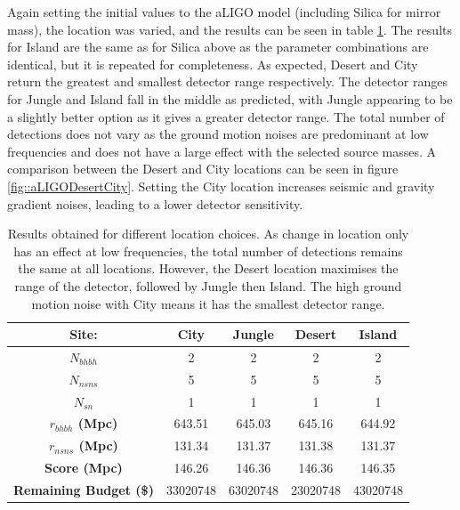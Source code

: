 \documentclass{article}
\begin{document}
Again setting the initial values to the aLIGO model (including Silica
for mirror mass), the location was varied, and the results can be seen
in table \ref{tab::locationtest}. The results for Island are the same
as for Silica above as the parameter combinations are identical, but
it is repeated for completeness. As expected, Desert and City return
the greatest and smallest detector range respectively. The detector
ranges for Jungle and Island fall in the middle as predicted, with
Jungle appearing to be a slightly better option as it gives a greater
detector range. The total number of detections does not vary as the
ground motion noises are predominant at low frequencies and does not
have a large effect with the selected source masses. A comparison
between the Desert and City locations can be seen in figure
\ref{fig::aLIGODesertCity}. Setting the City location increases
seismic and gravity gradient noises, leading to a lower detector
sensitivity. 
    
    \begin{table}[h!]
    \centering
    \captionsetup{width=0.9\textwidth}
    \caption{Results obtained for different location choices. As
      change in location only has an effect at low frequencies, the
      total number of detections remains the same at all
      locations. However, the Desert location maximises the range of
      the detector, followed by Jungle then Island. The high ground
      motion noise with City means it has the smallest detector
      range.}
    \begin{tabular}{ |c|c|c|c|c| } 
     \hline
     \textbf{Site:} & \textbf{City}  & \textbf{Jungle}  & \textbf{Desert}  & \textbf{Island} \\     \hline
     \textbf{$N_{bhbh}$}  & 2 & 2 & 2 & 2\\ 
     \hline
     \textbf{$N_{nsns}$}  & 5 & 5 & 5 & 5\\ 
     \hline
     \textbf{$N_{sn}$}  & 1 & 1  & 1 & 1 \\ 
     \hline
     \textbf{$r_{bhbh}$ (Mpc)}  & 643.51 & 645.03 & 645.16  & 644.92 \\ 
     \hline
     \textbf{$r_{nsns}$ (Mpc)}  & 131.34  & 131.37  & 131.38 & 131.37 \\ 
     \hline
    \textbf{Score (Mpc)}  & 146.26  & 146.36  & 146.36  & 146.35 \\ 
    \hline
    \textbf{Remaining Budget (\$)}  & 33020748  & 63020748  & 23020748 & 43020748 \\ 
    \hline
    \end{tabular}
    \label{tab::locationtest}
    \end{table}
    
\end{document}
